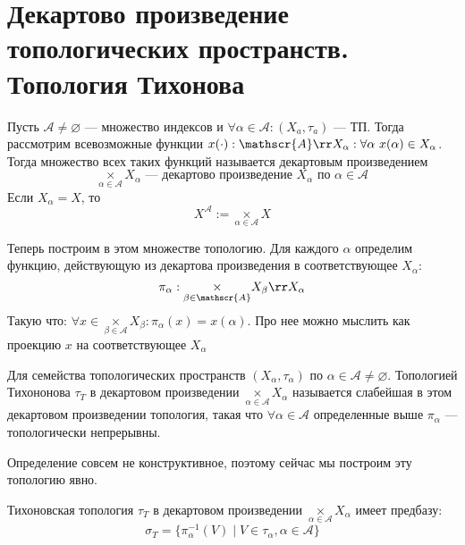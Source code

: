 
\section{Декартово произведение топологических пространств. Топология Тихонова}
\begin{definition}
Пусть $\mathscr{A} \neq \varnothing$ --- множество индексов и $\forall \alpha \in \mathscr{A}: (X_a, \tau_a)$ --- ТП. Тогда рассмотрим всевозможные функции $x(\cdot): \mathscr{A} \rr X_\alpha: \forall \alpha \ x(\alpha) \in X_\alpha$. Тогда множество всех таких функций называется декартовым произведением 
$$
\underset{\alpha \in \mathscr{A}}{\times}  X_\alpha \text{ --- декартово произведение $X_\alpha$ по $\alpha \in \mathscr{A}$}
$$
Если $X_\alpha = X$, то
$$
X^\mathscr{A} := \underset{\alpha \in \mathscr{A}}{\times}  X
$$
\end{definition}
Теперь построим в этом множестве топологию. Для каждого $\alpha$ определим функцию, действующую из декартова произведения в соответствующее $X_\alpha$: 
$$\pi_\alpha : \underset{\beta \in \mathscr{A}}{\times}  X_\beta \rr X_\alpha$$ 
Такую что:
$\forall x \in \underset{\beta \in \mathscr{A}}{\times}  X_\beta: \pi_\alpha(x) = x(\alpha)$. Про нее можно мыслить как проекцию $x$ на соответствующее $X_\alpha$
\begin{definition}
	Для семейства топологических пространств $(X_\alpha, \tau_\alpha)$ по $\alpha \in \mathscr{A} \neq \varnothing$. Топологией Тихононова $\tau_T$ в декартовом произведении $\underset{\alpha \in \mathscr{A}}{\times}  X_\alpha$ называется слабейшая в этом декартовом произведении топология, такая что $\forall \alpha \in \mathscr{A}$ определенные выше $\pi_\alpha$ --- топологически непрерывны. 
\end{definition}
Определение совсем не конструктивное, поэтому сейчас мы построим эту топологию явно.
\begin{claim}
	Тихоновская топология $\tau_T$ в декартовом произведении $\underset{\alpha \in \mathscr{A}}{\times} X_\alpha$ имеет предбазу:
	$$
	\sigma_T = \{\pi_\alpha^{-1}(V) \mid V \in \tau_\alpha, \alpha \in \mathscr{A}\}
	$$
\end{claim}
